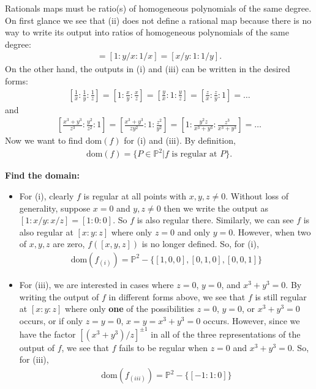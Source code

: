 \documentclass[12pt]{article}
\newcommand{\f}[2]{\frac{#1}{#2}}
\begin{document}
Rationals maps must be ratio(s) of homogeneous polynomials of the same degree. On first glance we see that (ii) does not define a rational map because there is no way to write its output into ratios of homogeneous polynomials of the same degree: 
\begin{align*}
[x:y:1] = [1:y/x:1/x] = [x/y:1:1/y].
\end{align*}
On the other hand, the outputs in (i) and (iii) can be written in the desired forms:
\begin{align*}
\left[\frac{1}{x}:\f{1}{y}:\f{1}{z}\right] = \left[1:\f{x}{y}:\f{x}{z}\right] = \left[\f{y}{x}:1:\f{y}{z}\right] = \left[\f{z}{x}:\f{z}{y}:1\right] = \dots
\end{align*}
and
\begin{align*}
\left[ \f{x^3 + y^3}{z^3} : \f{y^2}{z^2} :  1 \right] = \left[ \f{x^3 + y^3}{zy^2} : 1 : \f{z^2}{y^2} \right] = \left[ 1 : \f{y^2z}{x^3+y^3} : \f{z^3}{ x^3 + y^3} \right] = \dots
\end{align*}
Now we want to find $\mbox{dom}(f)$ for (i) and (iii). By definition, 
\begin{align*}
\mbox{dom}(f) = \{ P\in \mathbb{P}^2 \vert f \mbox{ is regular at } P \}.
\end{align*}

\noindent \textbf{Find the domain:}
\begin{itemize}
\item For (i), clearly $f$ is regular at all points with $x,y,z \neq 0$. Without loss of generality, suppose $x=0$ and $y,z\neq 0$ then we write the output as $[1:x/y:x/z] = [1:0:0] $. So $f$ is also regular there. Similarly, we can see $f$ is also regular at $[x:y:z]$ where only $z=0$ and only $y=0$. However, when two of $x,y,z$ are zero, $f([x,y,z])$ is no longer defined. So, for (i),
\begin{align*}
\boxed{\mbox{dom}(f_{(i)}) = \mathbb{P}^2 - \{ [1,0,0],[0,1,0],[0,0,1] \}}
\end{align*} 

\item For (iii), we are interested in cases where $z = 0$,  $y=0$, and $x^3 + y^3 = 0$. By writing the output of $f$ in different forms above, we see that $f$ is still regular at $[x:y:z]$ where only \textbf{one} of the possibilities $z = 0$,  $y=0$, or $x^3 + y^3 = 0$ occurs, or if only $z=y=0$, $x=y=x^3+y^3=0$ occurs. However, since we have the factor $[(x^3+y^3)/z]^{\pm 1}$ in all of the three representations of the output of $f$, we see that $f$ fails to be regular when $z=0$ and $x^3 + y^3 = 0$. So, for (iii),
\begin{align*}
\boxed{\mbox{dom}(f_{(iii)}) = \mathbb{P}^2 - \{[-1:1:0]\}}
\end{align*} 
\end{itemize}
\end{document}
